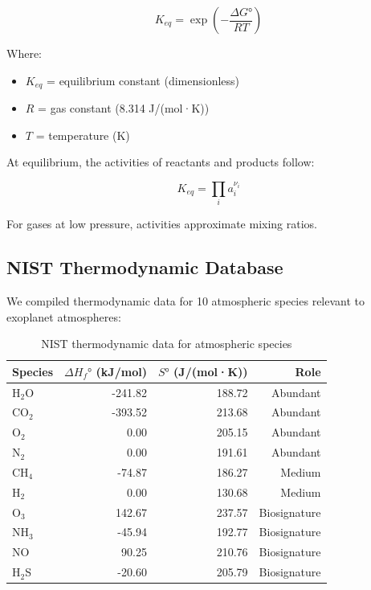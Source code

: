 \documentclass[12pt,a4paper,oneside]{report}
\begin{document}
\begin{equation}
K_{eq} = \exp\left(-\frac{\Delta G°}{RT}\right)
\label{eq:keq}
\end{equation}

Where:
\begin{itemize}
    \item $K_{eq}$ = equilibrium constant (dimensionless)
    \item $R$ = gas constant (8.314 J/(mol·K))
    \item $T$ = temperature (K)
\end{itemize}

At equilibrium, the activities of reactants and products follow:

\begin{equation}
K_{eq} = \prod_i a_i^{\nu_i}
\label{eq:equilibrium}
\end{equation}

For gases at low pressure, activities approximate mixing ratios.

\subsection{NIST Thermodynamic Database}

We compiled thermodynamic data for 10 atmospheric species relevant to exoplanet atmospheres:

\begin{table}[H]
\centering
\begin{tabular}{|l|r|r|r|}
\hline
\textbf{Species} & \textbf{$\Delta H_f°$ (kJ/mol)} & \textbf{$S°$ (J/(mol·K))} & \textbf{Role} \\
\hline
H$_2$O & -241.82 & 188.72 & Abundant \\
CO$_2$ & -393.52 & 213.68 & Abundant \\
O$_2$ & 0.00 & 205.15 & Abundant \\
N$_2$ & 0.00 & 191.61 & Abundant \\
CH$_4$ & -74.87 & 186.27 & Medium \\
H$_2$ & 0.00 & 130.68 & Medium \\
O$_3$ & 142.67 & 237.57 & Biosignature \\
NH$_3$ & -45.94 & 192.77 & Biosignature \\
NO & 90.25 & 210.76 & Biosignature \\
H$_2$S & -20.60 & 205.79 & Biosignature \\
\hline
\end{tabular}
\caption{NIST thermodynamic data for atmospheric species}
\end{table}
\end{document}
